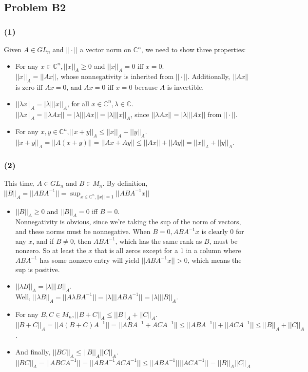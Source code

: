 \documentclass{article}
\newcommand{\complex}{\mathbb{C}}
\begin{document}
\subsection{Problem B2}
\subsubsection{(1)}
Given $A \in GL_n$ and $||\cdot||$ a vector norm on $\complex^n$, we need to show
three properties:
\begin{itemize}
  \item For any $x \in \complex^n, ||x||_A \geq 0$ and $||x||_A = 0$ iff $x = 0$.\\
    $||x||_A = ||Ax||$, whose nonnegativity is inherited from $||\cdot||$.
    Additionally, $||Ax||$ is zero iff $Ax = 0$, and $Ax = 0$ iff $x = 0$ because $A$ is invertible.
  \item $||\lambda x||_A = |\lambda|||x||_A$, for all $x \in \complex^n, \lambda \in \complex$.\\
    $||\lambda x||_A = ||\lambda A x|| = |\lambda|||A x|| = |\lambda| ||x||_A$, since 
    $||\lambda A x|| = |\lambda|||A x||$ from $||\cdot||$.
  \item For any $x,y \in \complex^n, ||x+y||_A \leq ||x||_A + ||y||_A$.\\
    $||x+y||_A = ||A(x+y)|| = ||Ax + Ay|| \leq ||Ax|| + ||Ay|| = ||x||_A + ||y||_A$.
\end{itemize}

\subsubsection{(2)}
This time, $A \in GL_n$ and $B \in M_n$. By definition, 
$||B||_A = ||ABA^{-1}|| = \displaystyle{\sup_{x \in \complex^n, ||x|| = 1}} ||ABA^{-1}x||$
\begin{itemize}
  \item $||B||_A \geq 0$ and $||B||_A = 0$ iff $B = 0$. \\
    Nonnegativity is obvious, since we're taking the sup of the norm of vectors, and these norms must
    be nonnegative. When $B = 0, ABA^{-1}x$ is clearly $0$ for any $x$, and if $B \neq 0$,
    then $ABA^{-1}$, which has the same rank as $B$, must be nonzero.
    So at least the $x$ that is all zeros except for a 1 in a column where $ABA^{-1}$ has
    some nonzero entry will yield $||ABA^{-1}x|| > 0$, which means the sup is positive.
  \item $||\lambda B||_A = |\lambda|||B||_A$.\\
    Well, $||\lambda B||_A = ||A\lambda BA^{-1}|| = |\lambda|||ABA^{-1}|| = |\lambda|||B||_A$.
  \item For any $B, C \in M_n, ||B + C||_A \leq ||B||_A + ||C||_A$.\\
    $||B + C||_A = ||A(B + C)A^{-1}|| = ||ABA^{-1} + ACA^{-1}|| \leq ||ABA^{-1}|| + ||ACA^{-1}||
     \leq ||B||_A + ||C||_A$.
  \item And finally, $||BC||_A \leq ||B||_A||C||_A$.\\
    $||BC||_A = ||ABCA^{-1}|| = ||ABA^{-1}ACA^{-1}|| \leq ||ABA^{-1}||||ACA^{-1}|| = ||B||_A||C||_A$

\end{itemize}
\end{document}
